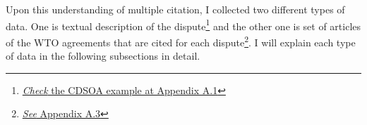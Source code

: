 Upon this understanding of multiple citation,
I collected two different types of data. %
One is textual description of the dispute\footnote{\hyperref[sub:factual-aspect-example]{\textit{Check} the CDSOA example at Appendix A.1}} and the other one is
set of articles of the WTO agreements that are
cited for each dispute\footnote{\hyperref[sub:cited-articles-table]{\textit{See} Appendix A.3}}.
I will explain each type of data in the following subsections in detail.


 

 
 

